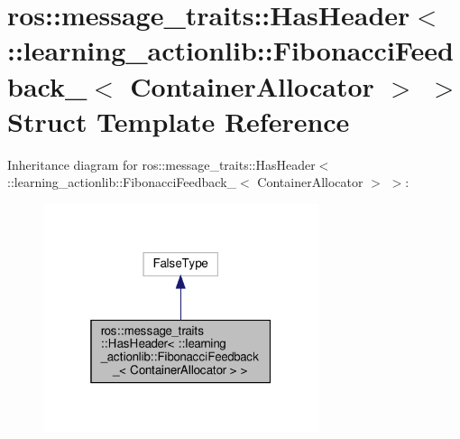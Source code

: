 \hypertarget{structros_1_1message__traits_1_1HasHeader_3_01_1_1learning__actionlib_1_1FibonacciFeedback___3_01ContainerAllocator_01_4_01_4}{}\section{ros\+:\+:message\+\_\+traits\+:\+:Has\+Header$<$ \+:\+:learning\+\_\+actionlib\+:\+:Fibonacci\+Feedback\+\_\+$<$ Container\+Allocator $>$ $>$ Struct Template Reference}
\label{structros_1_1message__traits_1_1HasHeader_3_01_1_1learning__actionlib_1_1FibonacciFeedback___3_01ContainerAllocator_01_4_01_4}


Inheritance diagram for ros\+:\+:message\+\_\+traits\+:\+:Has\+Header$<$ \+:\+:learning\+\_\+actionlib\+:\+:Fibonacci\+Feedback\+\_\+$<$ Container\+Allocator $>$ $>$\+:
\nopagebreak
\begin{figure}[H]
\begin{center}
\leavevmode
\includegraphics[width=229pt]{structros_1_1message__traits_1_1HasHeader_3_01_1_1learning__actionlib_1_1FibonacciFeedback___3_0e92da56344b445a56092436f4c1f18a3}
\end{center}
\end{figure}


